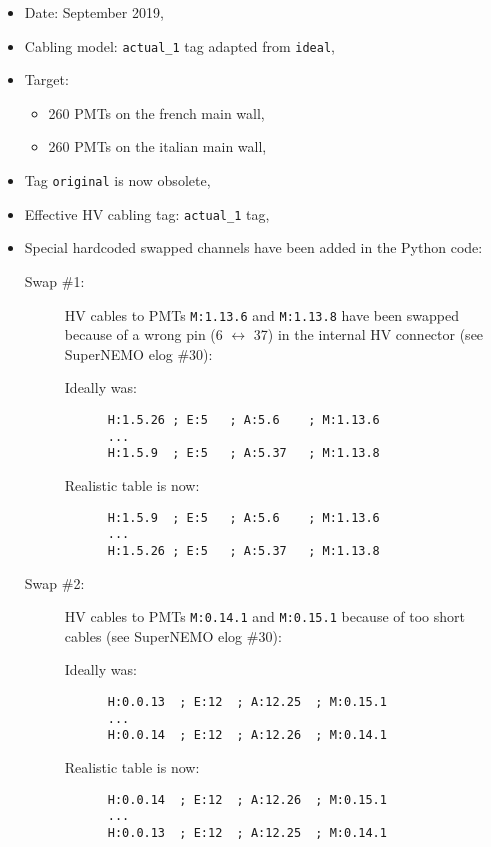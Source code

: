 \begin{itemize}
\item Date: September 2019,
\item Cabling model: \texttt{actual\_1} tag adapted from \texttt{ideal},
\item Target:
  \begin{itemize}
  \item   260 PMTs on the french main wall,
  \item   260 PMTs on the italian main wall,
  \end{itemize}
\item Tag \texttt{original} is now obsolete,
\item Effective HV cabling tag: \texttt{actual\_1} tag,
\item Special hardcoded swapped channels have been added in the Python code:
  \begin{description}
    
  \item[Swap \#1:]  HV cables to PMTs \verb+M:1.13.6+ and \verb+M:1.13.8+ have been swapped because
    of a wrong pin (6 $\leftrightarrow$ 37) in the internal HV connector (see SuperNEMO elog \#30):

    \par Ideally was:
    \begin{Verbatim}
      H:1.5.26 ; E:5   ; A:5.6    ; M:1.13.6  
      ...
      H:1.5.9  ; E:5   ; A:5.37   ; M:1.13.8  
    \end{Verbatim}                
    \par Realistic table is now:
    \begin{Verbatim}
      H:1.5.9  ; E:5   ; A:5.6    ; M:1.13.6  
      ...
      H:1.5.26 ; E:5   ; A:5.37   ; M:1.13.8  
    \end{Verbatim}                
    
  \item[Swap \#2:]  HV cables to PMTs \verb+M:0.14.1+ and \verb+M:0.15.1+ because of too short cables  (see SuperNEMO elog \#30):

    \par Ideally was:
    \begin{Verbatim}
      H:0.0.13  ; E:12  ; A:12.25  ; M:0.15.1  
      ...
      H:0.0.14  ; E:12  ; A:12.26  ; M:0.14.1
    \end{Verbatim}                
    \par Realistic table is now:
    \begin{Verbatim}
      H:0.0.14  ; E:12  ; A:12.26  ; M:0.15.1  
      ...
      H:0.0.13  ; E:12  ; A:12.25  ; M:0.14.1
    \end{Verbatim}                


\end{description}
\end{itemize}
